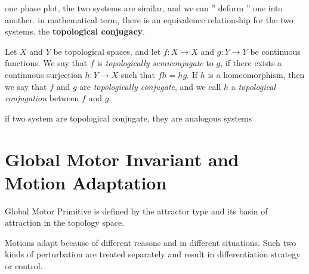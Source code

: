 one phase plot, the two systems are similar, and we can '' deform '' one into another.
in mathematical term, there is an equivalence relationship  for the two systems. the \textbf{topological conjugacy}.

Let $X$ and $Y$ be topological spaces, and let $f\colon X\to X$ and $g\colon Y\to Y$
be continuous functions. We say that $f$ is
\emph{topologically semiconjugate} to $g$, if there exists a continuous
surjection $h\colon Y\to X$ such that $fh=hg$. If $h$ is a homeomorphism,
then we say that $f$ and $g$ are \emph{topologically conjugate}, and we call
$h$ a \emph{topological conjugation} between $f$ and $g$.



if two system are topological conjugate, they are analogous systems





\section{Global Motor Invariant and Motion Adaptation}
Global Motor Primitive is defined by the attractor type and its basin of attraction in the topology space.


Motions adapt because of different reasons and in different situations.
Such two kinds of perturbation are treated separately and result in differentiation strategy or control.

